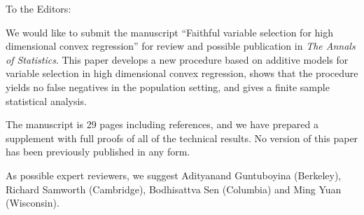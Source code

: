 \documentclass[12pt]{article}
\begin{document}
\thispagestyle{empty}
\myletterhead{}
\date{}
\vskip15pt

To the Editors:

We would like to submit the manuscript ``Faithful variable selection
for high dimensional convex regression'' for review and possible
publication in {\it The Annals of Statistics}.  This paper develops a
new procedure based on additive models for variable selection in high
dimensional convex regression, shows that the procedure yields no
false negatives in the population setting, and gives a finite sample
statistical analysis.

The manuscript is 29 pages including references, and we have
prepared a supplement with full proofs of all of the technical
results.  No version of this paper has been previously
published in any form.

As possible expert reviewers, we suggest Adityanand Guntuboyina
(Berkeley), Richard Samworth (Cambridge), Bodhisattva Sen (Columbia)
and Ming Yuan (Wisconsin).

\jdlucsig{}
\end{document}
